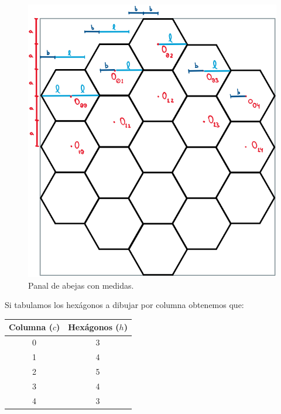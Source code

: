 \documentclass[oneside, a4paper]{article}
\begin{document}
            \begin{figure}[H]
                \centering
                \includegraphics[scale=0.45]{bee_panel.png}
                \caption{Panal de abejas con medidas.}
                \label{fig:bee_panel}
            \end{figure}

            Si tabulamos los hexágonos a dibujar por columna obtenemos que:

            \begin{center}
                \begin{tabular}{ | c | c | }
                    \hline
                    
                    \textbf{Columna ($c$)} & \textbf{Hexágonos ($h$)} \\
                    
                    \hline
                    
                    0                      & 3                        \\
                    1                      & 4                        \\
                    2                      & 5                        \\
                    3                      & 4                        \\
                    4                      & 3                        \\

                    \hline
                \end{tabular}
            \end{center}
\end{document}
